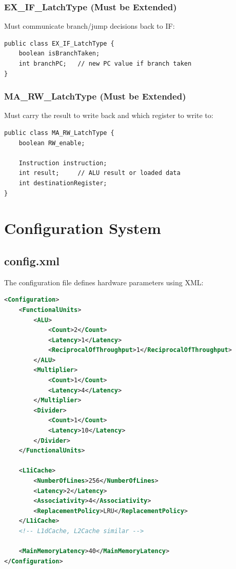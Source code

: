\documentclass[12pt,a4paper]{article}
\begin{document}
\subsubsection{EX\_IF\_LatchType (Must be Extended)}

Must communicate branch/jump decisions back to IF:

\begin{lstlisting}[style=javastyle, caption={Suggested EX\_IF\_LatchType fields}]
public class EX_IF_LatchType {
    boolean isBranchTaken;
    int branchPC;   // new PC value if branch taken
}
\end{lstlisting}

\subsubsection{MA\_RW\_LatchType (Must be Extended)}

Must carry the result to write back and which register to write to:

\begin{lstlisting}[style=javastyle, caption={Suggested MA\_RW\_LatchType fields}]
public class MA_RW_LatchType {
    boolean RW_enable;

    Instruction instruction;
    int result;     // ALU result or loaded data
    int destinationRegister;
}
\end{lstlisting}

\section{Configuration System}

\subsection{config.xml}

The configuration file defines hardware parameters using XML:

\begin{lstlisting}[language=XML, basicstyle=\ttfamily\footnotesize, frame=single, caption={config.xml}]
<Configuration>
    <FunctionalUnits>
        <ALU>
            <Count>2</Count>
            <Latency>1</Latency>
            <ReciprocalOfThroughput>1</ReciprocalOfThroughput>
        </ALU>
        <Multiplier>
            <Count>1</Count>
            <Latency>4</Latency>
        </Multiplier>
        <Divider>
            <Count>1</Count>
            <Latency>10</Latency>
        </Divider>
    </FunctionalUnits>

    <L1iCache>
        <NumberOfLines>256</NumberOfLines>
        <Latency>2</Latency>
        <Associativity>4</Associativity>
        <ReplacementPolicy>LRU</ReplacementPolicy>
    </L1iCache>
    <!-- L1dCache, L2Cache similar -->

    <MainMemoryLatency>40</MainMemoryLatency>
</Configuration>
\end{lstlisting}
\end{document}
